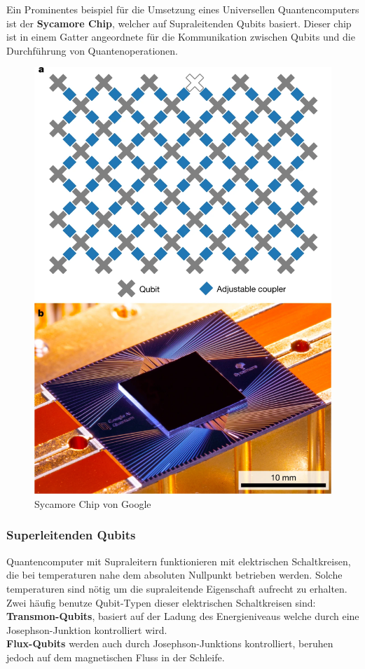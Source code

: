 Ein Prominentes beispiel für die Umsetzung eines Universellen Quantencomputers ist der \textbf{Sycamore Chip}, welcher auf Supraleitenden Qubits basiert.
Dieser chip ist in einem Gatter angeordnete für die Kommunikation zwischen Qubits und die Durchführung von Quantenoperationen.\\

\begin{figure}[H]
    \centering
    \includegraphics[width=0.7\linewidth]{img/SycamoreChip.png}
    \caption{Sycamore Chip von Google}
    \label{fig:Sycamore}
\end{figure}

\subsubsection{Superleitenden Qubits}
\label{subsub:superleiter}
Quantencomputer mit Supraleitern funktionieren mit elektrischen Schaltkreisen, die bei temperaturen nahe dem absoluten Nullpunkt betrieben werden. Solche temperaturen sind nötig
um die supraleitende Eigenschaft aufrecht zu erhalten.\\

Zwei häufig benutze Qubit-Typen dieser elektrischen Schaltkreisen sind:\\
\textbf{Transmon-Qubits}, basiert auf der Ladung des Energieniveaus welche durch eine Josephson-Junktion kontrolliert wird.\\
\textbf{Flux-Qubits} werden auch durch Josephson-Junktions kontrolliert, beruhen jedoch auf dem magnetischen Fluss in der Schleife.\\


